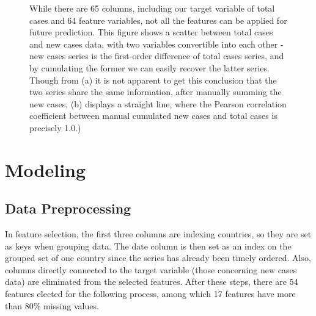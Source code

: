 \documentclass[11pt]{article}
\begin{document}
\begin{figure}[htb]
	\centering
	\caption{While there are 65 columns, including our target variable of total cases and 64 feature variables, not all the features can be applied for future prediction. This figure shows a scatter between total cases and new cases data, with two variables convertible into each other - new cases series is the first-order difference of total cases series, and by cumulating the former we can easily recover the latter series. Though from (a) it is not apparent to get this conclusion that the two series share the same information, after manually summing the new cases, (b) displays a straight line, where the Pearson correlation coefficient between manual cumulated new cases and total cases is precisely 1.0.)}
\end{figure}

\section{Modeling}
\subsection{Data Preprocessing}
In feature selection, the first three columns are indexing countries, so they are set as keys when grouping data. The date column is then set as an index on the grouped set of one country since the series has already been timely ordered. Also, columns directly connected to the target variable (those concerning new cases data) are eliminated from the selected features. After these steps, there are 54  features elected for the following process, among which 17 features have more than 80\% missing values.\\
\end{document}

